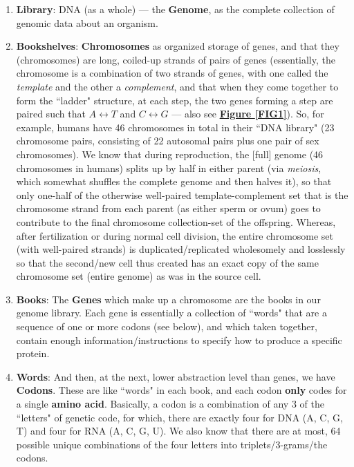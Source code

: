 \documentclass[a4paper, 18pt]{book} %
\begin{document}
\begin{enumerate}
\item \textbf{Library}: DNA (as a whole) --- the \textbf{Genome},	 as the complete collection of genomic data about an organism.
\item \textbf{Bookshelves}: \textbf{Chromosomes} as organized storage of genes, and that they (chromosomes) are long, coiled-up strands of pairs of genes (essentially, the chromosome is a combination of two strands of genes, with one called the \textit{template} and the other a \textit{complement}, and that when they come together to form the ``ladder" structure, at each step, the two genes forming a step are paired such that $A \leftrightarrow T$ and $C \leftrightarrow G$ \cite{passel_dna_structure} --- also see \textbf{\hyperref[FIG1]{Figure \ref{FIG1}}}). So, for example, humans have 46 chromosomes in total in their ``DNA library" (23 chromosome pairs, consisting of 22 autosomal pairs plus one pair of sex chromosomes). We know that during reproduction, the [full] genome (46 chromosomes in humans) splits up by half in either parent (via \textit{meiosis}, which somewhat shuffles the complete genome and then halves it\cite{genomics2025origin}), so that only one-half of the otherwise well-paired template-complement set that is the chromosome strand from each parent (as either sperm or ovum) goes to contribute to the final chromosome collection-set of the offspring\cite{libretexts2025gametogenesis}\cite{gregory1987oxford}. Whereas, after fertilization or during normal cell division, the entire chromosome set (with well-paired strands) is duplicated/replicated wholesomely and losslessly so that the second/new cell thus created has an exact copy of the same chromosome set (entire genome) as was in the source cell\cite{leicester_cellcycle}. 
\item \textbf{Books}: The \textbf{Genes} which make up a chromosome are the books in our genome library. Each gene is essentially a collection of ``words" that are a sequence of one or more codons (see below), and which taken together, contain enough information/instructions to specify how to produce a specific protein\cite{gregory1987oxford}\cite{venville2006analogies}.
\item \textbf{Words}: And then, at the next, lower abstraction level than genes, we have \textbf{Codons}. These are like ``words" in each book, and each codon \textbf{only} codes for a single \textbf{amino acid}. Basically, a codon is a combination of any 3 of the ``letters" of genetic code, for which, there are exactly four for DNA (A, C, G, T) and four for RNA (A, C, G, U). We also know that there are at most, 64 possible unique combinations of the four letters into triplets/3-grams/the codons\cite{gregory1987oxford}.

\end{enumerate}
\end{document}
